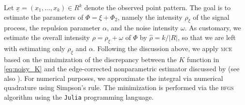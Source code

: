 \documentclass[11pt,a4paper,oneside]{article}
\theoremstyle{definition}
\theoremstyle{remark}
\begin{document}
Let $\underline{x} = (x_1, \ldots, x_k) \in R^k$ denote the observed point pattern. 
The goal is to estimate the parameters of $\Phi = \xi + \Phi_2$, namely the intensity $\rho_\xi$ of the signal process, the repulsion parameter $\alpha$, and the noise intensity $\omega$. As customary, we estimate the overall intensity $\rho = \rho_\xi + \omega$ of $\Phi$ by $\hat \rho = k / |R|$, so that we are left with estimating only $\rho_\xi$ and $\alpha$.
Following the discussion above, we apply \textsc{mce} based on the minimization of the discrepancy between the $K$ function in \eqref{eq:noisy_K} and  the edge-corrected nonparametric estimator discussed by \cite{ripley1976second} (see also \citet{MoWaBook03}).
For numerical purposes, we approximate the integral via numerical quadrature using Simpson's rule. The minimization is performed via the \textsc{bfgs} algorithm using the \texttt{Julia} programming language.


\end{document}
